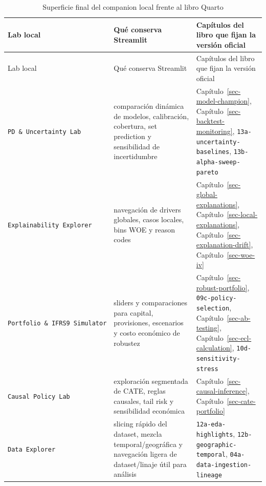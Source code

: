 \documentclass[
  spanish,
  11pt,
  letterpaper,
]{scrbook}
\theoremstyle{plain}
\theoremstyle{remark}
\begin{document}
\begin{longtable}[]{@{}
  >{\raggedright\arraybackslash}p{}
  >{\raggedright\arraybackslash}p{}
  >{\raggedright\arraybackslash}p{}@{}}
\caption{Superficie final del companion local frente al libro
Quarto}\label{tbl-streamlit-book-map}\tabularnewline
\toprule\noalign{}
\begin{minipage}[b]{\linewidth}\raggedright
Lab local
\end{minipage} & \begin{minipage}[b]{\linewidth}\raggedright
Qué conserva Streamlit
\end{minipage} & \begin{minipage}[b]{\linewidth}\raggedright
Capítulos del libro que fijan la versión oficial
\end{minipage} \\
\midrule\noalign{}
\endfirsthead
\toprule\noalign{}
\begin{minipage}[b]{\linewidth}\raggedright
Lab local
\end{minipage} & \begin{minipage}[b]{\linewidth}\raggedright
Qué conserva Streamlit
\end{minipage} & \begin{minipage}[b]{\linewidth}\raggedright
Capítulos del libro que fijan la versión oficial
\end{minipage} \\
\midrule\noalign{}
\endhead
\bottomrule\noalign{}
\endlastfoot
\texttt{PD\ \&\ Uncertainty\ Lab} & comparación dinámica de modelos,
calibración, cobertura, set prediction y sensibilidad de incertidumbre &
Capítulo~\ref{sec-model-champion},
Capítulo~\ref{sec-backtest-monitoring},
\texttt{13a-uncertainty-baselines}, \texttt{13b-alpha-sweep-pareto} \\
\texttt{Explainability\ Explorer} & navegación de drivers globales,
casos locales, bins WOE y reason codes &
Capítulo~\ref{sec-global-explanations},
Capítulo~\ref{sec-local-explanations},
Capítulo~\ref{sec-explanation-drift}, Capítulo~\ref{sec-woe-iv} \\
\texttt{Portfolio\ \&\ IFRS9\ Simulator} & sliders y comparaciones para
capital, provisiones, escenarios y costo económico de robustez &
Capítulo~\ref{sec-robust-portfolio}, \texttt{09c-policy-selection},
Capítulo~\ref{sec-ab-testing}, Capítulo~\ref{sec-ecl-calculation},
\texttt{10d-sensitivity-stress} \\
\texttt{Causal\ Policy\ Lab} & exploración segmentada de CATE, reglas
causales, tail risk y sensibilidad económica &
Capítulo~\ref{sec-causal-inference},
Capítulo~\ref{sec-cate-portfolio} \\
\texttt{Data\ Explorer} & slicing rápido del dataset, mezcla
temporal/geográfica y navegación ligera de dataset/linaje útil para
análisis & \texttt{12a-eda-highlights},
\texttt{12b-geographic-temporal}, \texttt{04a-data-ingestion-lineage} \\
\end{longtable}
\end{document}
